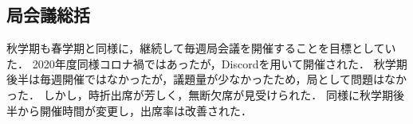 \subsection*{局会議総括}

秋学期も春学期と同様に，継続して毎週局会議を開催することを目標としていた．
2020年度同様コロナ禍ではあったが，Discordを用いて開催された．
秋学期後半は毎週開催ではなかったが，議題量が少なかったため，局として問題はなかった．
しかし，時折出席が芳しく，無断欠席が見受けられた．
同様に秋学期後半から開催時間が変更し，出席率は改善された．

